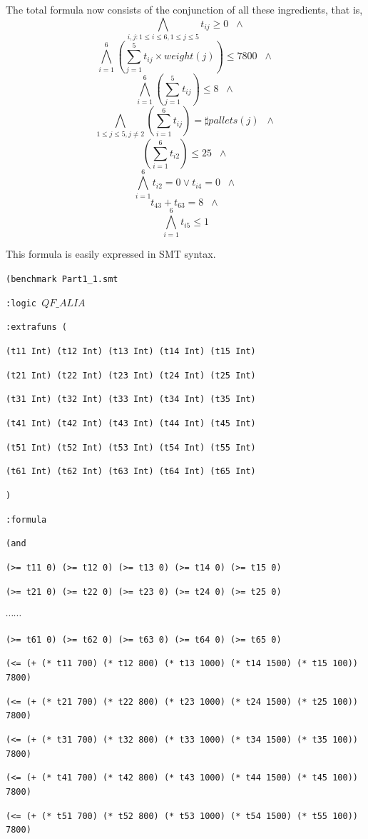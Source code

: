 \documentclass[11pt]{article}
\begin{document}
The total formula now consists of the conjunction of all these
ingredients, that is,
\[ \bigwedge_{i,j:1 \leq i \leq 6, 1 \leq j \leq 5} t_{ij} \geq 0 \;\; \wedge \]
\[ \bigwedge_{i=1}^6  (\sum_{j=1}^5 t_{ij} \times weight(j)) \leq 7800 \;\; \wedge \]
\[ \bigwedge_{i=1}^6 (\sum_{j=1}^5 t_{ij}) \leq 8 \;\; \wedge \]
\[ \bigwedge_{1\leq j \leq5, j\neq2} (\sum_{i=1}^6 t_{ij}) = \sharp pallets(j) \;\; \wedge \]
\[ (\sum_{i=1}^6 t_{i2}) \leq 25 \;\; \wedge \]
\[ \bigwedge_{i=1}^6 t_{i2}=0 \vee t_{i4}=0 \;\; \wedge \]
\[ t_{43} + t_{63} = 8 \;\; \wedge \]
\[ \bigwedge_{i=1}^6 t_{i5} \leq 1 \]

This formula is easily expressed in SMT syntax.

{\footnotesize

{\tt (benchmark Part1\_1.smt}

{\tt :logic $QF\_ALIA$}

{\tt :extrafuns (}

{\tt (t11 Int) (t12 Int) (t13 Int) (t14 Int) (t15 Int) }

{\tt (t21 Int) (t22 Int) (t23 Int) (t24 Int) (t25 Int) }

{\tt (t31 Int) (t32 Int) (t33 Int) (t34 Int) (t35 Int) }

{\tt (t41 Int) (t42 Int) (t43 Int) (t44 Int) (t45 Int) }

{\tt (t51 Int) (t52 Int) (t53 Int) (t54 Int) (t55 Int) }

{\tt (t61 Int) (t62 Int) (t63 Int) (t64 Int) (t65 Int) }

{\tt )}

{\tt :formula}

{\tt   (and}

{\tt (>= t11 0) (>= t12 0) (>= t13 0) (>= t14 0) (>= t15 0)}

{\tt (>= t21 0) (>= t22 0) (>= t23 0) (>= t24 0) (>= t25 0)}

$\cdots \cdots$

{\tt (>= t61 0) (>= t62 0) (>= t63 0) (>= t64 0) (>= t65 0) }

{\tt (<= (+ (* t11 700) (* t12 800) (* t13 1000) (* t14 1500) (* t15 100)) 7800)}

{\tt (<= (+ (* t21 700) (* t22 800) (* t23 1000) (* t24 1500) (* t25 100)) 7800)}

{\tt (<= (+ (* t31 700) (* t32 800) (* t33 1000) (* t34 1500) (* t35 100)) 7800)}

{\tt (<= (+ (* t41 700) (* t42 800) (* t43 1000) (* t44 1500) (* t45 100)) 7800)}

{\tt (<= (+ (* t51 700) (* t52 800) (* t53 1000) (* t54 1500) (* t55 100)) 7800)}

}
\end{document}
